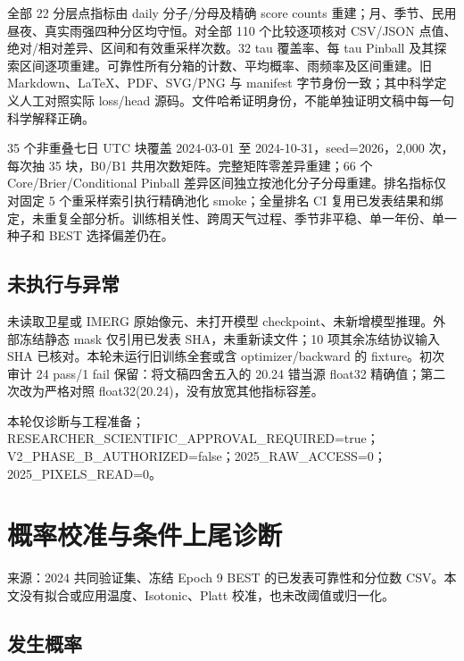 \documentclass[UTF8,a4paper,10pt,fontset=fandol]{ctexart}
\begin{document}
全部 22 分层点指标由 daily 分子/分母及精确 score counts 重建；月、季节、民用昼夜、真实雨强四种分区均守恒。对全部 110 个比较逐项核对 CSV/JSON 点值、绝对/相对差异、区间和有效重采样次数。32 tau 覆盖率、每 tau Pinball 及其探索区间逐项重建。可靠性所有分箱的计数、平均概率、雨频率及区间重建。旧 Markdown、LaTeX、PDF、SVG/PNG 与 manifest 字节身份一致；其中科学定义人工对照实际 loss/head 源码。文件哈希证明身份，不能单独证明文稿中每一句科学解释正确。\par

35 个非重叠七日 UTC 块覆盖 2024-03-01 至 2024-10-31，seed=2026，2,000 次，每次抽 35 块，B0/B1 共用次数矩阵。完整矩阵零差异重建；66 个 Core/Brier/Conditional Pinball 差异区间独立按池化分子分母重建。排名指标仅对固定 5 个重采样索引执行精确池化 smoke；全量排名 CI 复用已发表结果和绑定，未重复全部分析。训练相关性、跨周天气过程、季节非平稳、单一年份、单一种子和 BEST 选择偏差仍在。\par

\subsection*{未执行与异常}

未读取卫星或 IMERG 原始像元、未打开模型 checkpoint、未新增模型推理。外部冻结静态 mask 仅引用已发表 SHA，未重新读文件；10 项其余冻结协议输入 SHA 已核对。本轮未运行旧训练全套或含 optimizer/backward 的 fixture。初次审计 24 pass/1 fail 保留：将文稿四舍五入的 20.24 错当源 float32 精确值；第二次改为严格对照 float32(20.24)，没有放宽其他指标容差。\par

本轮仅诊断与工程准备；RESEARCHER\_SCIENTIFIC\_APPROVAL\_REQUIRED=true；V2\_PHASE\_B\_AUTHORIZED=false；2025\_RAW\_ACCESS=0；2025\_PIXELS\_READ=0。\par

\clearpage
\section*{概率校准与条件上尾诊断}

来源：2024 共同验证集、冻结 Epoch 9 BEST 的已发表可靠性和分位数 CSV。本文没有拟合或应用温度、Isotonic、Platt 校准，也未改阈值或归一化。\par

\subsection*{发生概率}
\end{document}
